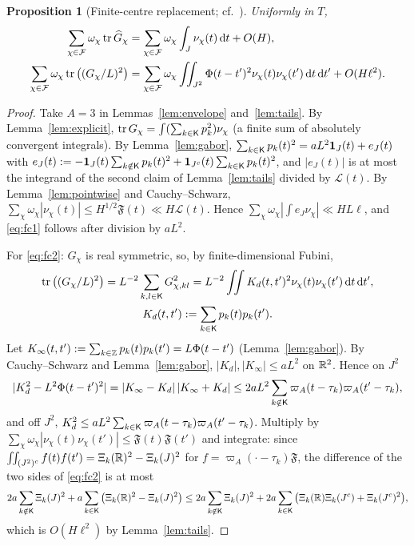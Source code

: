 \documentclass[11pt]{amsart}
\newtheorem{proposition}[theorem]{Proposition}
\theoremstyle{definition}
\theoremstyle{remark}
\numberwithin{equation}{section}
\begin{document}
\begin{proposition}[Finite-centre replacement; cf.\ {\cite[Props.~5.2, 5.4]{HY26}}]\label{prop:finitecentre}
Uniformly in $T$,
\begin{align}
\sum_{\chi\in\mathcal F}\omega_\chi\operatorname{tr}\widehat G_\chi&=\sum_{\chi\in\mathcal F}\omega_\chi\int_J\nu_\chi(t)\,\mathrm d t+O(H),\label{eq:fc1}\\
\sum_{\chi\in\mathcal F}\omega_\chi\operatorname{tr}\big((G_\chi/L)^2\big)&=\sum_{\chi\in\mathcal F}\omega_\chi\iint_{J^2}\Phi(t-t')^2\nu_\chi(t)\nu_\chi(t')\,\mathrm d t\,\mathrm d t'+O(H\ell^2).\label{eq:fc2}
\end{align}
\end{proposition}
\begin{proof}
Take $A=3$ in Lemmas~\ref{lem:envelope} and~\ref{lem:tails}. By Lemma~\ref{lem:explicit}, $\operatorname{tr} G_\chi=\int(\sum_{k\in\mathsf K}p_k^2)\nu_\chi$ (a finite sum of absolutely convergent integrals). By Lemma~\ref{lem:gabor}, $\sum_{k\in\mathsf K}p_k(t)^2=aL^2\mathbf 1_J(t)+e_J(t)$ with $e_J(t):=-\mathbf 1_J(t)\sum_{k\notin\mathsf K}p_k(t)^2+\mathbf 1_{J^c}(t)\sum_{k\in\mathsf K}p_k(t)^2$, and $|e_J(t)|$ is at most the integrand of the second claim of Lemma~\ref{lem:tails} divided by $\mathcal L(t)$. By Lemma~\ref{lem:pointwise} and Cauchy--Schwarz, $\sum_\chi\omega_\chi|\nu_\chi(t)|\le H^{1/2}\mathfrak F(t)\ll H\mathcal L(t)$. Hence $\sum_\chi\omega_\chi|\int e_J\nu_\chi|\ll HL\ell$, and \eqref{eq:fc1} follows after division by $aL^2$.

For \eqref{eq:fc2}: $G_\chi$ is real symmetric, so, by finite-dimensional Fubini,
\begin{gather*}
\operatorname{tr}\big((G_\chi/L)^2\big)=L^{-2}\sum_{k,l\in\mathsf K}G_{\chi,kl}^2=L^{-2}\iint K_d(t,t')^2\nu_\chi(t)\nu_\chi(t')\,\mathrm d t\,\mathrm d t',\\
K_d(t,t'):=\sum_{k\in\mathsf K}p_k(t)p_k(t').
\end{gather*} Let $K_\infty(t,t'):=\sum_{k\in\mathbb Z}p_k(t)p_k(t')=L\Phi(t-t')$ (Lemma~\ref{lem:gabor}). By Cauchy--Schwarz and Lemma~\ref{lem:gabor}, $|K_d|,|K_\infty|\le aL^2$ on $\mathbb R^2$. Hence on $J^2$
\[
|K_d^2-L^2\Phi(t-t')^2|=|K_\infty-K_d|\,|K_\infty+K_d|\le2aL^2\sum_{k\notin\mathsf K}\varpi_A(t-\tau_k)\varpi_A(t'-\tau_k),
\]
and off $J^2$, $K_d^2\le aL^2\sum_{k\in\mathsf K}\varpi_A(t-\tau_k)\varpi_A(t'-\tau_k)$. Multiply by $\sum_\chi\omega_\chi|\nu_\chi(t)\nu_\chi(t')|\le\mathfrak F(t)\mathfrak F(t')$ and integrate: since $\iint_{(J^2)^c}f(t)f(t')=\Xi_k(\mathbb R)^2-\Xi_k(J)^2$ for $f=\varpi_A(\cdot-\tau_k)\mathfrak F$, the difference of the two sides of \eqref{eq:fc2} is at most
\[
2a\sum_{k\notin\mathsf K}\Xi_k(J)^2+a\sum_{k\in\mathsf K}\big(\Xi_k(\mathbb R)^2-\Xi_k(J)^2\big)\le2a\sum_{k\notin\mathsf K}\Xi_k(J)^2+2a\sum_{k\in\mathsf K}\big(\Xi_k(\mathbb R)\Xi_k(J^c)+\Xi_k(J^c)^2\big),
\]
which is $O(H\ell^2)$ by Lemma~\ref{lem:tails}.
\end{proof}
\end{document}
